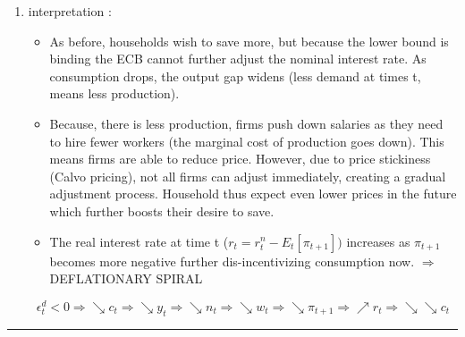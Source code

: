 \documentclass{article}
\begin{document}
\begin{itemize}
\begin{enumerate}
        \item interpretation : 
        \begin{interpretationbox}
            \begin{itemize}
                \item As before, households wish to save more, but because the lower bound is binding the ECB cannot further adjust the nominal interest rate. As consumption drops, the output gap widens (less demand at times t, means less production).
                \item  Because, there is less production, firms push down  salaries as they need to hire fewer workers (the marginal cost of production goes down). This means firms are able to reduce price. However, due to price stickiness (Calvo pricing), not all firms can adjust immediately, creating a gradual adjustment process. Household thus expect even lower prices in the future which further boosts their desire to save. 
                \item  The real interest rate at time t ($r_t = r_t^n-E_t[\pi_{t+1}])$ increases as $\pi_{t+1}$ becomes more negative further dis-incentivizing consumption now. $\Longrightarrow$ DEFLATIONARY SPIRAL
            \end{itemize}
        \begin{equation}
            \epsilon_t^d < 0 \Longrightarrow \searrow c_t \Longrightarrow \searrow y_t \Longrightarrow \searrow n_t \Longrightarrow \searrow w_t \Longrightarrow \searrow \pi_{t+1} \Longrightarrow \nearrow r_t \Longrightarrow \searrow \searrow c_t
        \end{equation}
        \end{interpretationbox}
    \end{enumerate}
\end{itemize}
        \noindent\rule{\textwidth}{0.4pt}
\end{document}
